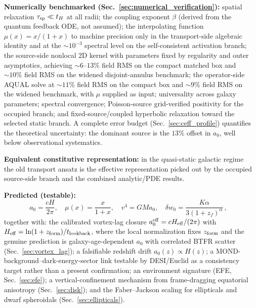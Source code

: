 \documentclass[11pt]{article}
\begin{document}
\textbf{Numerically benchmarked
(Sec.~\ref{sec:numerical_verification}):}
spatial relaxation $\tau_{\rm sp}\ll t_H$ at all radii;
the coupling exponent $\beta$ (derived from the quantum
feedback ODE, not assumed);
the interpolating function $\mu(x)=x/(1+x)$ to
machine precision only in the transport-side algebraic
identity and at the $\sim10^{-3}$ spectral level on the
self-consistent activation branch; the source-side
nonlocal 2D kernel with parameters fixed by regularity and outer
asymptotics, achieving $\sim6$--$13\%$ field RMS on the compact
matched box and $\sim10\%$ field RMS on the widened disjoint-annulus
benchmark; the operator-side AQUAL solve at
$\sim11\%$ field RMS on the compact box and $\sim9\%$ field RMS on the widened
benchmark, with $\mu$ supplied as input; universality across
galaxy parameters; spectral convergence; Poisson-source
grid-verified positivity for the occupied branch; and fixed-source/coupled
hyperbolic relaxation toward the selected static branch.
A complete error budget (Sec.~\ref{sec:ceff_profile}) quantifies
the theoretical uncertainty: the dominant source is the
$13\%$ offset in $a_0$, well below observational systematics.

\textbf{Equivalent constitutive representation:} in the quasi-static galactic
regime the old transport ansatz is the effective representation
picked out by the occupied source-side branch and the combined
analytic/PDE results.

\textbf{Predicted (testable):}
\[
a_0=\frac{cH}{2\pi},\quad \mu(x)=\frac{x}{1+x},\quad v^4=GMa_0,\quad
\delta w_0 = \frac{K\alpha}{3(1+z_f)^\alpha}\,,
\]
together with: the calibrated vortex-lag closure
$a_0^{\rm eff}=cH_{\rm eff}/(2\pi)$ with
$H_{\rm eff}=\ln(1+z_{\rm form})/t_{\rm lookback}$, where the
local normalization fixes $z_{\rm form}$ and the genuine prediction is
galaxy-age-dependent $a_0$ with correlated BTFR scatter
(Sec.~\ref{sec:vortex_lag});
a falsifiable redshift drift $a_0(z)\propto H(z)$;
a MOND-background--dark-energy-sector link testable by DESI/Euclid
as a consistency target rather than a present confirmation;
an environment signature (EFE, Sec.~\ref{sec:efe});
a vertical-confinement mechanism from frame-dragging equatorial
anisotropy (Sec.~\ref{sec:disk}); and the Faber--Jackson
scaling for ellipticals and dwarf spheroidals
(Sec.~\ref{sec:ellipticals}).
\end{document}
